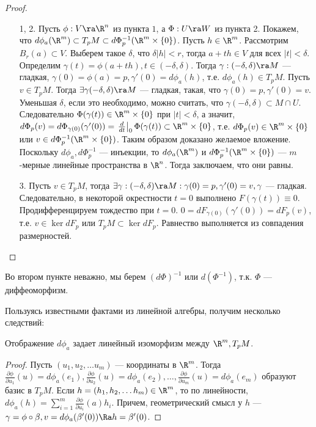 \begin{proof}\indent
    \begin{enumerate}
        \item[1, 2.] Пусть \(\phi: V \ra \R^n\) из пункта \(1\), а \(\Phi: U \ra W\) из пункта 2. Покажем, что \(d\phi_a(\R^m) \subset T_pM \subset d\Phi_p^{-1}(\R^m \times \{0\})\). Пусть \(h \in \R^m\). Рассмотрим \(B_r(a) \subset V\). Выберем такое \(\delta\), что \(\delta|h| < r\), тогда \(a + th \in V\) для всех \(|t| < \delta\). Определим \(\gamma(t) = \phi(a + th), t \in (-\delta, \delta)\). Тогда \(\gamma: (-\delta, \delta) \ra M\) --- гладкая, \(\gamma(0) = \phi(a) = p, \gamma'(0) = d\phi_a(h)\), т.е. \(d\phi_a(h) \in T_pM\). Пусть \(v \in T_pM\). Тогда \(\exists \gamma (-\delta, \delta) \ra M\) --- гладкая, такая, что \(\gamma(0) = p, \gamma'(0) = v\). Уменьшая \(\delta\), если это необходимо, можно считать, что \(\gamma(-\delta, \delta) \subset M \cap U\). Следовательно \(\Phi(\gamma(t)) \in \R^m \times \{0\}\) при \(|t| < \delta\), а значит, \(d\Phi_p(v) = d\Phi_{\gamma(0)}(\gamma'(0)) = \left.\frac{d}{dt}\right|_0\Phi(\gamma(t)) \subset \R^m \times \{0\}\), т.е. \(d\Phi_p(v) \in \R^m \times \{0\}\) или \(v \in d\Phi^{-1}_p(\R^m \times \{0\})\). Таким образом доказано желаемое вложение. Поскольку \(d\phi_a, d\Phi^{-1}_p\) --- инъекции, то \(d\phi_a(\R^m)\) и \(d\Phi_p^{-1}(\R^m \times \{0\})\) --- \(m\)-мерные линейные пространства в \(\R^n\). Тогда заключаем, что они равны.
        \item[3.] Пусть \(v \in T_pM\), тогда \(\exists \gamma: (-\delta, \delta) \ra M: \gamma(0) = p, \gamma'(0) = v, \gamma\) --- гладкая. Следовательно, в некоторой окрестности \(t = 0\) выполнено \(F(\gamma(t)) \equiv 0\). Продифференцируем тождество при \(t = 0\). \(0 = dF_{\gamma(0)}(\gamma'(0)) = dF_p(v)\), т.е. \(v \in \ker dF_p\) или \(T_pM \subset \ker dF_p\). Равнество выполняется из совпадения размерностей.
    \end{enumerate}    
\end{proof}

\begin{note}
    Во втором пункте неважно, мы берем \((d\Phi)^{-1}\) или \(d(\Phi^{-1})\), т.к. \(\Phi\) --- диффеоморфизм.
\end{note}

Пользуясь известными фактами из линейной алгебры, получим несколько следствий:

\begin{corollary}
    Отображение \(d\phi_a\) задает линейный изоморфизм между \(\R^m, T_pM\).
\end{corollary}
\begin{proof}
    Пусть \((u_1, u_2, \dots u_m)\) --- координаты в \(\R^m\). Тогда \(\frac{\partial \phi}{\partial u_1}(u) = d\phi_a(e_1), \frac{\partial \phi}{\partial u_2}(u) = d\phi_a(e_2), \dots, \frac{\partial \phi}{\partial u_m}(u) = d\phi_a(e_m)\) образуют базис в \(T_pM\). Если \(h = (h_1, h_2, \dots h_m) \in \R^m\), то по линейности, \(d\phi_a(h) = \sum_{i = 1}^m\frac{\partial \phi}{\partial u_i}(a)h_i\). Причем, геометрический смысл у \(h\) --- \(\gamma = \phi \circ \beta, v = d\phi_a(\beta'(0)) \Ra h = \beta'(0)\).
\end{proof}

